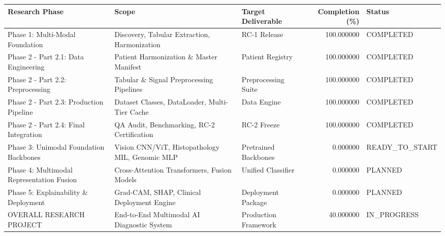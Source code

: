 \begin{tabular}{lllrl}
\toprule
Research Phase & Scope & Target Deliverable & Completion (\%) & Status \\
\midrule
Phase 1: Multi-Modal Foundation & Discovery, Tabular Extraction, Harmonization & RC-1 Release & 100.000000 & COMPLETED \\
Phase 2 - Part 2.1: Data Engineering & Patient Harmonization \& Master Manifest & Patient Registry & 100.000000 & COMPLETED \\
Phase 2 - Part 2.2: Preprocessing & Tabular \& Signal Preprocessing Pipelines & Preprocessing Suite & 100.000000 & COMPLETED \\
Phase 2 - Part 2.3: Production Pipeline & Dataset Classes, DataLoader, Multi-Tier Cache & Data Engine & 100.000000 & COMPLETED \\
Phase 2 - Part 2.4: Final Integration & QA Audit, Benchmarking, RC-2 Certification & RC-2 Freeze & 100.000000 & COMPLETED \\
Phase 3: Unimodal Foundation Backbones & Vision CNN/ViT, Histopathology MIL, Genomic MLP & Pretrained Backbones & 0.000000 & READY\_TO\_START \\
Phase 4: Multimodal Representation Fusion & Cross-Attention Transformers, Fusion Models & Unified Classifier & 0.000000 & PLANNED \\
Phase 5: Explainability \& Deployment & Grad-CAM, SHAP, Clinical Deployment Engine & Deployment Package & 0.000000 & PLANNED \\
OVERALL RESEARCH PROJECT & End-to-End Multimodal AI Diagnostic System & Production Framework & 40.000000 & IN\_PROGRESS \\
\bottomrule
\end{tabular}
